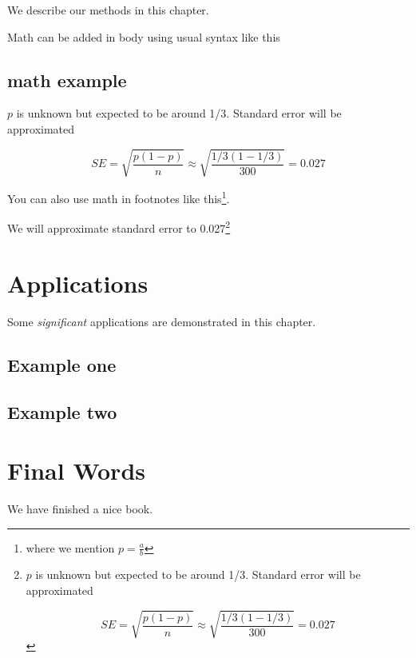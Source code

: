 \documentclass[
]{book}
\begin{document}
We describe our methods in this chapter.

Math can be added in body using usual syntax like this

\section{math example}\label{math-example}

\(p\) is unknown but expected to be around 1/3. Standard error will be approximated

\[
SE = \sqrt{\frac{p(1-p)}{n}} \approx \sqrt{\frac{1/3 (1 - 1/3)} {300}} = 0.027
\]

You can also use math in footnotes like this\footnote{where we mention \(p = \frac{a}{b}\)}.

We will approximate standard error to 0.027\footnote{\(p\) is unknown but expected to be around 1/3. Standard error will be approximated

  \[
  SE = \sqrt{\frac{p(1-p)}{n}} \approx \sqrt{\frac{1/3 (1 - 1/3)} {300}} = 0.027
  \]}

\chapter{Applications}\label{applications}

Some \emph{significant} applications are demonstrated in this chapter.

\section{Example one}\label{example-one}

\section{Example two}\label{example-two}

\chapter{Final Words}\label{final-words}

We have finished a nice book.

  
\end{document}
